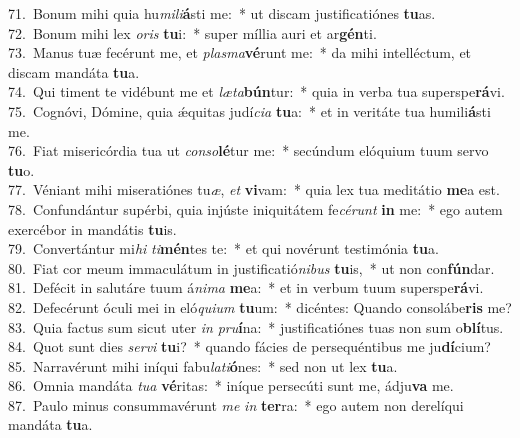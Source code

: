 {71.~}Bonum mihi quia hu\textit{mi}\textit{li}\textbf{á}sti me:~* ut discam justificatiónes \textbf{tu}as.\\
{72.~}Bonum mihi lex \textit{o}\textit{ris} \textbf{tu}i:~* super míllia auri et ar\textbf{gén}ti.\\
{73.~}Manus tuæ fecérunt me, et \textit{plas}\textit{ma}\textbf{vé}runt me:~* da mihi intelléctum, et discam mandáta \textbf{tu}a.\\
{74.~}Qui timent te vidébunt me et \textit{læ}\textit{ta}\textbf{bún}tur:~* quia in verba tua superspe\textbf{rá}vi.\\
{75.~}Cognóvi, Dómine, quia ǽquitas judí\textit{ci}\textit{a} \textbf{tu}a:~* et in veritáte tua humili\textbf{á}sti me.\\
{76.~}Fiat misericórdia tua ut \textit{con}\textit{so}\textbf{lé}tur me:~* secúndum elóquium tuum servo \textbf{tu}o.\\
{77.~}Véniant mihi miseratiónes tu\textit{æ}, \textit{et} \textbf{vi}vam:~* quia lex tua meditátio \textbf{me}a est.\\
{78.~}Confundántur supérbi, quia injúste iniquitátem fe\textit{cé}\textit{runt} \textbf{in} me:~* ego autem exercébor in mandátis \textbf{tu}is.\\
{79.~}Convertántur mi\textit{hi} \textit{ti}\textbf{mén}tes te:~* et qui novérunt testimónia \textbf{tu}a.\\
{80.~}Fiat cor meum immaculátum in justificatió\textit{ni}\textit{bus} \textbf{tu}is,~* ut non con\textbf{fún}dar.\\
{81.~}Defécit in salutáre tuum á\textit{ni}\textit{ma} \textbf{me}a:~* et in verbum tuum superspe\textbf{rá}vi.\\
{82.~}Defecérunt óculi mei in eló\textit{qui}\textit{um} \textbf{tu}um:~* dicéntes: Quando consolábe\textbf{ris} me?\\
{83.~}Quia factus sum sicut uter \textit{in} \textit{pru}\textbf{í}na:~* justificatiónes tuas non sum o\textbf{blí}tus.\\
{84.~}Quot sunt dies \textit{ser}\textit{vi} \textbf{tu}i?~* quando fácies de persequéntibus me ju\textbf{dí}cium?\\
{85.~}Narravérunt mihi iníqui fabu\textit{la}\textit{ti}\textbf{ó}nes:~* sed non ut lex \textbf{tu}a.\\
{86.~}Omnia mandáta \textit{tu}\textit{a} \textbf{vé}ritas:~* iníque persecúti sunt me, ádju\textbf{va} me.\\
{87.~}Paulo minus consummavérunt \textit{me} \textit{in} \textbf{ter}ra:~* ego autem non derelíqui mandáta \textbf{tu}a.\\
